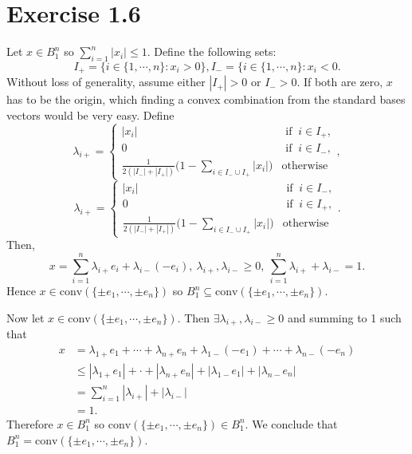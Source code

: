 \section*{Exercise 1.6}
Let $x \in B_1^n$ so $\sum_{i = 1}^{n} |x_i| \leq 1$. Define the following sets: 
\[ I_+ = \{ i \in \{1, \cdots, n\}: x_i > 0 \}, I_- = \{ i \in \{1, \cdots, n\}: x_i < 0. \]
Without loss of generality, assume either $|I_+| > 0$ or $I_- > 0$. If both are zero, $x$ has to be 
the origin, which finding a convex combination from the standard bases vectors would be very easy.
Define 
\[ \lambda_{i+} = \begin{cases}
	|x_i| &\text{ if } \ i \in I_+, \\
	0 &\text{ if } \ i \in I_-, \\
	\frac{1}{2(|I_-| + |I_+|)} \biggl( 1 - \sum_{i \in I_- \cup I_+}^{} |x_i| \biggr) &\text{otherwise}
\end{cases}, \]
\[ \lambda_{i+} = \begin{cases}
	|x_i| &\text{ if } \ i \in I_-, \\
	0 &\text{ if } \ i \in I_+, \\
	\frac{1}{2(|I_-| + |I_+|)} \biggl( 1 - \sum_{i \in I_- \cup I_+}^{} |x_i| \biggr) &\text{otherwise}
\end{cases}. \]
Then, 
\[ x = \sum_{i = 1}^{n} \lambda_{i+}e_i + \lambda_{i-} (-e_i), \ \lambda_{i+}, \lambda_{i-} \geq 0, \ \sum_{i = 1}^{n} 
\lambda_{i+} + \lambda_{i-} = 1. \]
Hence $x \in \text{conv}(\{\pm e_1, \cdots, \pm e_n\})$ so $B_1^n \subseteq \text{conv}(\{\pm e_1, \cdots, \pm e_n\})$.

Now let $x \in \text{conv}(\{\pm e_1, \cdots, \pm e_n\})$. Then $\exists \lambda_{i+}, \lambda_{i-} \geq 0$ and summing 
to 1 such that 
\begin{align*}
	x 
	&= \lambda_{1+} e_1 + \cdots + \lambda_{n+} e_n + \lambda_{1-} (-e_1) + \cdots + \lambda_{n-} (-e_n) \\
	&\leq |\lambda_{1+} e_1| + \cdot + |\lambda_{n+} e_n| + |\lambda_{1-} e_1| + |\lambda_{n-} e_n| \\
	&= \sum_{i = 1}^{n} |\lambda_{i+}| + |\lambda_{i-}| \\
	&= 1.
\end{align*}
Therefore $x \in B_1^n$ so $\text{conv}(\{\pm e_1, \cdots, \pm e_n\}) \in B_1^n$. We conclude that 
$B_1^n = \text{conv}(\{\pm e_1, \cdots, \pm e_n\})$. 


\newpage
